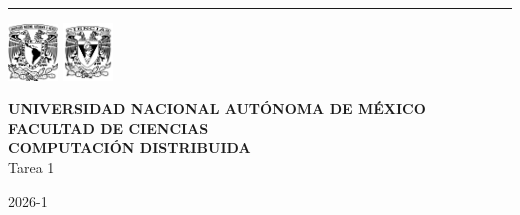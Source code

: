 \documentclass[12pt]{article}
\begin{document}
\begin{center}

    \hrule
    \includegraphics[width=0.1\textwidth]{img/escudo-unam.png}
    \hfill
    \includegraphics[width=0.1\textwidth]{img/escudo-ciencias.png}
    
    \vspace{-0.5cm}
    
    {\large \textbf{UNIVERSIDAD NACIONAL AUTÓNOMA DE MÉXICO}}\\
    {\medium \textbf{FACULTAD DE CIENCIAS}}\\
    {\medium \textbf{COMPUTACIÓN DISTRIBUIDA}}\\
    {\medium Tarea 1}
\end{center}

\vspace{0.5cm}


\mbox{}\hfill 2026-1

\vspace{0.8cm}
\end{document}
